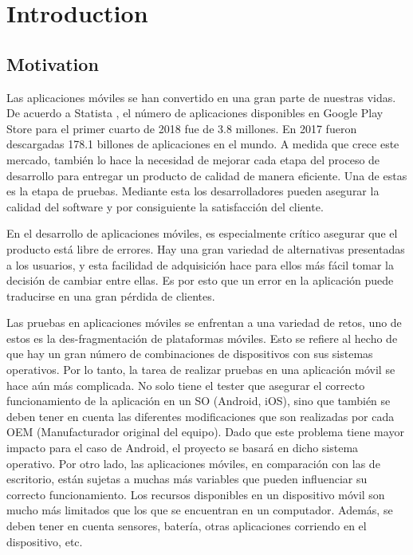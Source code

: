 %
\chapter{Introduction}
\label{sec:intro}

\section{Motivation}

Las aplicaciones móviles se han convertido en una gran parte de nuestras vidas. De acuerdo a Statista \cite{MobileStatista}, el número de aplicaciones disponibles en Google Play Store para el primer cuarto de 2018 fue de 3.8 millones. En 2017 fueron descargadas 178.1 billones de aplicaciones en el mundo. A medida que crece este mercado, también lo hace la necesidad de mejorar cada etapa del proceso de desarrollo para entregar un producto de calidad de manera eficiente. Una de estas es la etapa de pruebas. Mediante esta los desarrolladores pueden asegurar la calidad del software y por consiguiente la satisfacción del cliente.

En el desarrollo de aplicaciones móviles, es especialmente crítico asegurar que el producto está libre de errores. Hay una gran variedad de alternativas presentadas a los usuarios, y esta facilidad de adquisición hace para ellos más fácil tomar la decisión de cambiar entre ellas. Es por esto que un error en la aplicación puede traducirse en una gran pérdida de clientes.

Las pruebas en aplicaciones móviles se enfrentan a una variedad de retos, uno de estos es la des-fragmentación de plataformas móviles. Esto se refiere al hecho de que hay un gran número de combinaciones de dispositivos con sus sistemas operativos. Por lo tanto, la tarea de realizar pruebas en una aplicación móvil se hace aún más complicada. No solo tiene el tester que asegurar el correcto funcionamiento de la aplicación en un SO (Android, iOS), sino que también se deben tener en cuenta las diferentes modificaciones que son realizadas por cada OEM (Manufacturador original del equipo). Dado que este problema tiene mayor impacto para el caso de Android, el proyecto se basará en dicho sistema operativo.
Por otro lado, las aplicaciones móviles, en comparación con las de escritorio, están sujetas a muchas más variables que pueden influenciar su correcto funcionamiento. Los recursos disponibles en un dispositivo móvil son mucho más limitados que los que se encuentran en un computador. Además, se deben tener en cuenta sensores, batería, otras aplicaciones corriendo en el dispositivo, etc.

